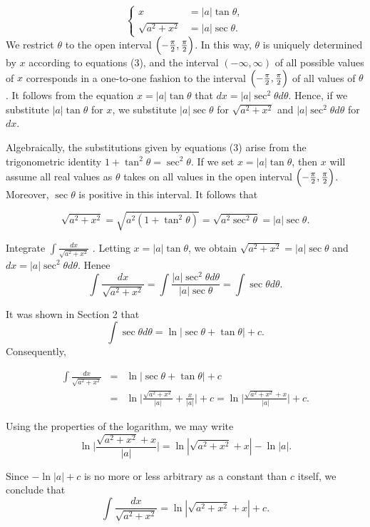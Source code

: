 
\begin{equation}
\left \{ \begin{array}{rl}
                        x &= |a| \tan \theta, \\
\sqrt{a^2 + x^2} &= |a| \sec \theta. 
          \end{array}
\right.
\label{eq7.3.3}
\end{equation}
\noindent We restrict $\theta$ to the open interval $\Bigl(-\frac{\pi}{2}, \frac{\pi}{2} \Bigr)$. In this way, $\theta$ is uniquely determined by $x$ according to equations (3), and the interval $(-\infty, \infty)$ of all possible values of $x$ corresponds in a one-to-one fashion to the interval $\Bigl(-\frac{\pi}{2}, \frac{\pi}{2} \Bigr)$ of all values of $\theta$. It follows from the equation $x = |a| \tan \theta$ that $dx = |a| \sec^{2} \theta d\theta$. Hence, if we substitute 
$|a| \tan \theta$ for $x$, we substitute $|a| \sec \theta$ for $\sqrt{a^2 + x^2}$ and $|a| \sec^{2}\theta d\theta$ for $dx$.

Algebraically, the substitutions given by equations (3) arise from the trigonometric identity $1 + \tan^{2} \theta = \sec^{2}\theta$. If we set 
$x = |a| \tan \theta$, then $x$ will assume all real values as $\theta$ 
takes on all values in the open interval $\Bigl(-\frac{\pi}{2}, \frac{\pi}{2}\Bigr)$. Moreover, $\sec \theta$ is positive in this interval. It follows that

$$
\sqrt{a^2 + x^2} = \sqrt{a^{2}(1 + \tan^{2} \theta)} = \sqrt{a^{2}\sec^{2}\theta} = |a| \sec \theta.
$$

\begin{example}
Integrate $\int \frac{dx}{\sqrt{a^2 + x^2}}$ . Letting $x = |a| \tan \theta$, we obtain $\sqrt{a^2 + x^2}= |a| \sec \theta$ and $dx = |a| \sec^{2}\theta d\theta$.
\noindent Henee
$$
\int \frac{dx}{\sqrt{a^2 + x^2}} = \int \frac{|a| \sec^{2} \theta d\theta}{|a| \sec \theta} 
=  \int  \sec \theta d\theta.
$$

\noindent It was shown in Section 2 that
$$
\int \sec \theta d\theta = \ln |\sec \theta + \tan \theta| + c.
$$
\noindent Consequently, 

\begin{eqnarray*}
\int \frac{dx}{\sqrt{a^2 + x^2}} 
&=& \ln |\sec \theta + \tan \theta| + c \\
&=& \ln \Big| \frac{\sqrt{a^2 + x^2}}{|a|} + \frac{x}{|a|} \Big| + c = \ln \Big| \frac{\sqrt{a^2 + x^2} + x}{|a|} \Big| + c.
\end{eqnarray*}

\noindent Using the properties of the logarithm, we may write
$$
\ln \Big| \frac{\sqrt{a^2 + x^2} + x}{|a|} \Big| = \ln |\sqrt{a^2 + x^2} + x| - \ln |a|.
$$

\noindent Since $-\ln|a|+ c$ is no more or less arbitrary as a constant than $c$ itself, we conclude that
$$
\int \frac{dx}{\sqrt{a^2 + x^2}} =  \ln | \sqrt{a^2 + x^2} + x | + c.
$$
\end{example}

